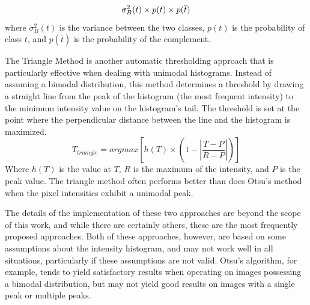 \documentclass[letterpaper]{report}
\begin{document}
{%
\begin{equation}
\sigma^2_B (t) \times p(t) \times p(\overline{t}) \\
\end{equation}
where $\sigma^2_B (t)$ is the variance between the two classes, $p(t)$ is the probability of class $t$, and $p(\overline{t})$ is the probability of the complement.

The Triangle Method is another automatic thresholding approach that is particularly effective when dealing with unimodal histograms. Instead of assuming a bimodal distribution, this method determines a threshold by drawing a straight line from the peak of the histogram (the most frequent intensity) to the minimum intensity value on the histogram’s tail. The threshold is set at the point where the perpendicular distance between the line and the histogram is maximized.
\begin{equation}
T_{triangle} = argmax \left[ h(T) \times \left( 1 - \left| \frac{T - P}{R - P} \right| \right) \right]
\end{equation}
Where $h(T)$ is the value at $T$, $R$ is the maximum of the intensity, and $P$ is the peak value. The triangle method often performs better than does Otsu's method when the pixel intensities exhibit a unimodal peak.

The details of the implementation of these two approaches are beyond the scope of this work, and while there are certainly others, these are the most frequently proposed approaches. Both of these approaches, however, are based on some assumptions about the intensity histogram, and may not work well in all situations, particularly if these assumptions are not valid. Otsu's algorithm, for example, tends to yield satisfactory results when operating on images possessing a bimodal distribution, but may not yield good results on images with a single peak or multiple peaks.

}
\end{document}
